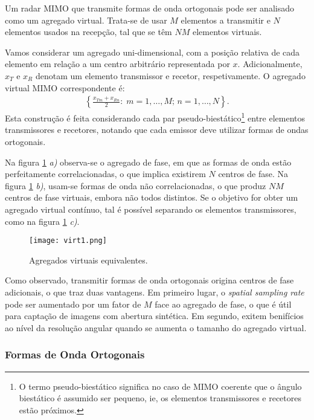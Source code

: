 \documentclass[purist,portuguese]{ist-report}
\begin{document}
Um radar MIMO que transmite formas de onda ortogonais pode ser analisado como um agregado virtual.
Trata-se de usar $M$ elementos a transmitir e $N$ elementos usados na recepção, tal que se têm $NM$ elementos virtuais.

Vamos considerar um agregado uni-dimensional, com a posição relativa de cada elemento em relação a um centro arbitrário representada por $x$. 
Adicionalmente, $x_T$ e $x_R$ denotam um elemento transmissor e recetor, respetivamente.
O agregado virtual MIMO correspondente é:
\begin{align}
  \left\{ \frac{x_{Tm}+x_{Rn}}{2}:\; m=1,\ldots,M;\,n=1,\ldots,N \right\}.
  \label{eq:virtualmimo}
\end{align}
Esta construção é feita considerando cada par pseudo-biestático\footnote{O termo pseudo-biestático significa no caso de MIMO coerente que o ângulo biestático é assumido ser pequeno, ie, os elementos transmissores e recetores estão próximos.} entre elementos transmissores e recetores, notando que cada emissor deve utilizar formas de ondas ortogonais.

Na figura \ref{fig:virt1} \emph{a)} observa-se o agregado de fase, em que as formas de onda estão perfeitamente correlacionadas, o que implica existirem $N$ centros de fase.
Na figura \ref{fig:virt1} \emph{b)}, usam-se formas de onda não correlacionadas, o que produz $NM$ centros de fase virtuais, embora não todos distintos.
Se o objetivo for obter um agregado virtual contínuo, tal é possível separando os elementos transmissores, como na figura \ref{fig:virt1} \emph{c)}. 

\begin{figure}[h]
  \centering
  \texttt{[image: virt1.png]}
  \caption{Agregados virtuais equivalentes.}
  \label{fig:virt1}
\end{figure}

Como observado, transmitir formas de onda ortogonais origina centros de fase adicionais, o que traz duas vantagens.
Em primeiro lugar, o \textit{spatial sampling rate} pode ser aumentado por um fator de $M$ face ao agregado de fase, o que é útil para captação de imagens com abertura sintética.
Em segundo, exitem benifícios ao nível da resolução angular quando se aumenta o tamanho do agregado virtual.

\subsubsection{Formas de Onda Ortogonais}
\end{document}
